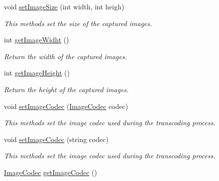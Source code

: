 \begin{DoxyCompactItemize}
void \hyperlink{classbr_1_1ufscar_1_1lince_1_1streaming_1_1ImageShotter_a0e98451cd6314d1649499d7f0b607530}{setImageSize} (int width, int heigh)
\begin{DoxyCompactList}\small\item\em This methods set the size of the captured images. \item\end{DoxyCompactList}\item 
int \hyperlink{classbr_1_1ufscar_1_1lince_1_1streaming_1_1ImageShotter_a68bcdd3106b8031bd7db5850622a9c33}{getImageWidht} ()
\begin{DoxyCompactList}\small\item\em Return the width of the captured images. \item\end{DoxyCompactList}\item 
int \hyperlink{classbr_1_1ufscar_1_1lince_1_1streaming_1_1ImageShotter_a62c43a5a2cc5052cbb5c12e5b7678696}{getImageHeight} ()
\begin{DoxyCompactList}\small\item\em Return the height of the captured images. \item\end{DoxyCompactList}\item 
void \hyperlink{classbr_1_1ufscar_1_1lince_1_1streaming_1_1ImageShotter_add200f16fd87f355bc7163cca546f52a}{setImageCodec} (\hyperlink{namespacebr_1_1ufscar_1_1lince_1_1streaming_aeaf227c1caf3369cc7c90188dac89494}{ImageCodec} codec)
\begin{DoxyCompactList}\small\item\em This methods set the image codec used during the transcoding process. \item\end{DoxyCompactList}\item 
void \hyperlink{classbr_1_1ufscar_1_1lince_1_1streaming_1_1ImageShotter_a625630582196a1d12d576c8ffea2e3b8}{setImageCodec} (string codec)
\begin{DoxyCompactList}\small\item\em This methods set the image codec used during the transcoding process. \item\end{DoxyCompactList}\item 
\hyperlink{namespacebr_1_1ufscar_1_1lince_1_1streaming_aeaf227c1caf3369cc7c90188dac89494}{ImageCodec} \hyperlink{classbr_1_1ufscar_1_1lince_1_1streaming_1_1ImageShotter_a285b42308861c21f163d15b084253f48}{getImageCodec} ()

\end{DoxyCompactItemize}
